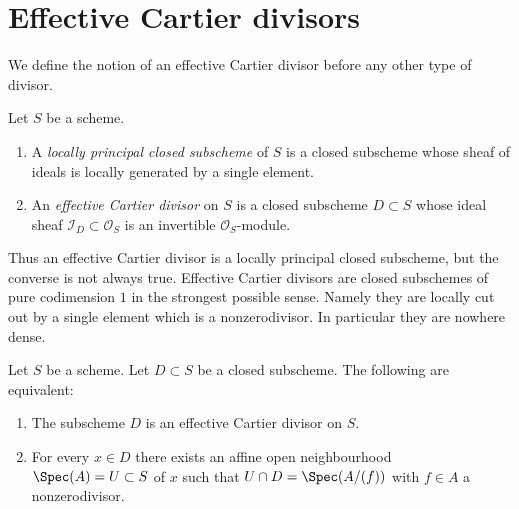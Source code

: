 \section{Effective Cartier divisors}
\label{section-effective-Cartier-divisors}

\noindent
We define the notion of an effective Cartier divisor before any other type
of divisor.

\begin{definition}
\label{definition-effective-Cartier-divisor}
Let $S$ be a scheme.
\begin{enumerate}
\item A {\it locally principal closed subscheme} of $S$ is a closed subscheme
whose sheaf of ideals is locally generated by a single element.
\item An {\it effective Cartier divisor} on $S$ is a closed subscheme
$D \subset S$ whose ideal sheaf $\mathcal{I}_D \subset \mathcal{O}_S$
is an invertible $\mathcal{O}_S$-module.
\end{enumerate}
\end{definition}

\noindent
Thus an effective Cartier divisor is a locally principal closed subscheme,
but the converse is not always true. Effective Cartier divisors are closed
subschemes of pure codimension $1$ in the strongest possible sense. Namely
they are locally cut out by a single element which is a nonzerodivisor.
In particular they are nowhere dense.

\begin{lemma}
\label{lemma-characterize-effective-Cartier-divisor}
Let $S$ be a scheme.
Let $D \subset S$ be a closed subscheme.
The following are equivalent:
\begin{enumerate}
\item The subscheme $D$ is an effective Cartier divisor on $S$.
\item For every $x \in D$ there exists an affine open neighbourhood
$\Spec(A) = U \subset S$ of $x$ such that
$U \cap D = \Spec(A/(f))$ with $f \in A$ a nonzerodivisor.
\end{enumerate}
\end{lemma}

